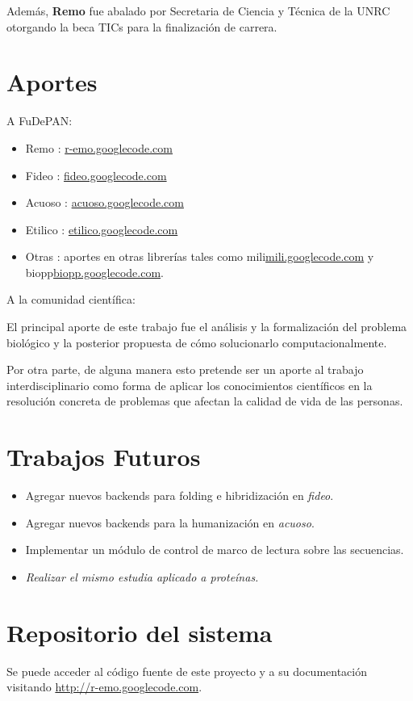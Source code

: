 Además, \textbf{Remo} fue abalado por Secretaria de Ciencia y Técnica de la UNRC otorgando la beca TICs para la finalización de carrera.

\section{Aportes}
\par A FuDePAN:
\begin{itemize}
    \item Remo   : \url{r-emo.googlecode.com}
    \item Fideo   : \url{fideo.googlecode.com}
    \item Acuoso  : \url{acuoso.googlecode.com}
    \item Etilico : \url{etilico.googlecode.com}
    \item Otras   : aportes en otras librerías tales como mili\url{mili.googlecode.com} y biopp\url{biopp.googlecode.com}.
\end{itemize}

\par A la comunidad científica:
\par El principal aporte de este trabajo fue el análisis y la formalización del
problema biológico y la posterior propuesta de cómo solucionarlo
computacionalmente. 

\par Por otra parte, de alguna manera esto pretende ser un aporte al trabajo interdisciplinario como forma de aplicar los conocimientos científicos en la resolución concreta de problemas que afectan la calidad de vida de las personas.

\section{Trabajos Futuros}
\begin{itemize}
	\item Agregar nuevos backends para folding e hibridización en \emph{fideo}.	
	\item Agregar nuevos backends para la humanización en \emph{acuoso}.
	\item Implementar un módulo de control de marco de lectura sobre las secuencias.
	\item \emph{Realizar el mismo estudia aplicado a proteínas.}
\end{itemize}

\section{Repositorio del sistema}
Se puede acceder al código fuente de este proyecto y a su documentación visitando \url{http://r-emo.googlecode.com}.


